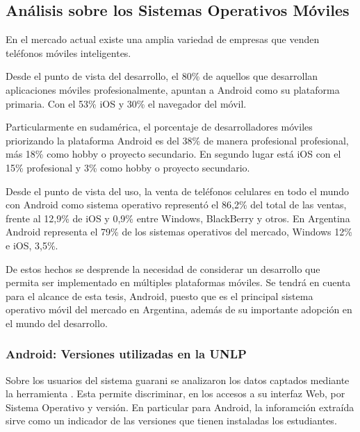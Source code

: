 \subsection{Análisis sobre los Sistemas Operativos Móviles}
\label{sistemas_operativos}

En el mercado actual existe una amplia variedad de empresas que venden
teléfonos móviles inteligentes.

Desde el punto de vista del desarrollo, el 80\% de aquellos que desarrollan
aplicaciones móviles profesionalmente, apuntan a Android como su plataforma
primaria. Con el 53\% iOS y 30\% el navegador del móvil\cite{DevNation2}.


Particularmente en sudamérica, el porcentaje de desarrolladores móviles
priorizando la plataforma Android es del 38\% de manera profesional profesional,
más 18\% como hobby o proyecto secundario. En segundo lugar está iOS con el 15\%
profesional y 3\% como hobby o proyecto secundario\cite{DevNation2}.

Desde el punto de vista del uso, la venta de teléfonos celulares en todo el
mundo con Android como sistema operativo representó el 86,2\% del total de las
ventas, frente al 12,9\% de iOS y 0,9\% entre Windows, BlackBerry y otros.
En Argentina Android representa el 79\% de los sistemas operativos del mercado,
Windows 12\% e iOS, 3,5\%\cite{SmartphoneMarketShare}.

De estos hechos se desprende la necesidad de considerar un desarrollo que permita ser implementado en múltiples plataformas móviles. Se tendrá en cuenta para el alcance de esta tesis, Android, puesto que es el principal sistema operativo móvil del mercado en Argentina\cite{SmartphoneMarketShare}, además de su importante adopción en el mundo del desarrollo\cite{DevNation2}.

\subsubsection{Android: Versiones utilizadas en la UNLP}
\label{sistemas_operativos_versiones}

Sobre los usuarios del sistema \gls{guarani} se analizaron los datos captados mediante la herramienta . Esta permite discriminar, en los accesos a su interfaz Web, por Sistema Operativo y versión. En particular para Android, la inforamción extraída sirve como un indicador de las versiones que tienen instaladas los estudiantes.

